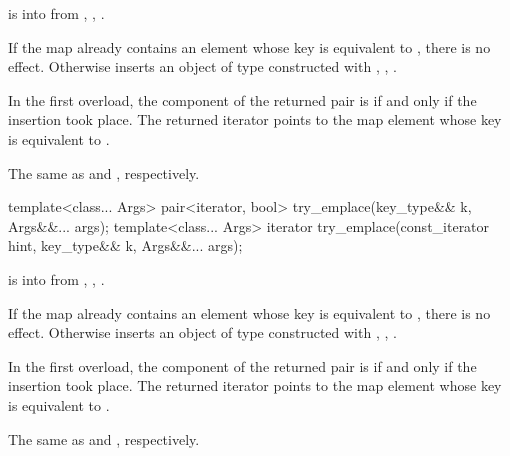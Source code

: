 \begin{itemdescr}
\pnum
\expects
{} is  into 
from , ,
.

\pnum
\effects
If the map already contains an element
whose key is equivalent to ,
there is no effect.
Otherwise inserts an object of type 
constructed with , ,
.

\pnum
\returns
In the first overload,
the  component of the returned pair is 
if and only if the insertion took place.
The returned iterator points to the map element
whose key is equivalent to .

\pnum
\complexity
The same as  and ,
respectively.
\end{itemdescr}

%
\begin{itemdecl}
template<class... Args>
  pair<iterator, bool> try_emplace(key_type&& k, Args&&... args);
template<class... Args>
  iterator try_emplace(const_iterator hint, key_type&& k, Args&&... args);
\end{itemdecl}

\begin{itemdescr}
\pnum
\expects
{} is  into 
from , ,
.

\pnum
\effects
If the map already contains an element
whose key is equivalent to ,
there is no effect.
Otherwise inserts an object of type 
constructed with , ,
.

\pnum
\returns
In the first overload,
the  component of the returned pair is 
if and only if the insertion took place.
The returned iterator points to the map element
whose key is equivalent to .

\pnum
\complexity
The same as  and ,
respectively.
\end{itemdescr}

